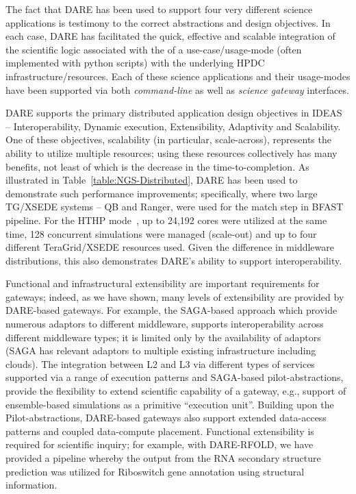 \documentclass[]{svjour3}
\begin{document}
The fact that DARE has been used to support four very different
science applications is testimony to the correct abstractions and
design objectives. In each case, DARE has facilitated the quick,
effective and scalable integration of the scientific logic associated
with the of a use-case/usage-mode (often implemented with python
scripts) with the underlying HPDC infrastructure/resources. Each of
these science applications and their usage-modes have been supported
via both {\it command-line} as well as {\it science gateway}
interfaces.

DARE supports the primary distributed application design objectives in
IDEAS~\cite{ideas} -- Interoperability, Dynamic execution,
Extensibility, Adaptivity and Scalability. One of these objectives,
scalability (in particular, scale-across), represents the ability to
utilize multiple resources; using these resources collectively has
many benefits, not least of which is the decrease in the
time-to-completion. As illustrated in
Table~\ref{table:NGS-Distributed}, DARE has been used to demonstrate
such performance improvements; specifically, where two large TG/XSEDE
systems -- QB and Ranger, were used for the match step in BFAST
pipeline. For the HTHP mode~\cite{bigjob-ccgrid12}, up to 24,192 cores
were utilized at the same time, 128 concurrent simulations were
managed (scale-out) and up to four different TeraGrid/XSEDE resources
used. Given the difference in middleware distributions, this also
demonstrates DARE's ability to support interoperability.

Functional and infrastructural extensibility are important
requirements for gateways; indeed, as we have shown, many levels of
extensibility are provided by DARE-based gateways. For example, the
SAGA-based approach which provide numerous adaptors to different
middleware, supports interoperability across different middleware
types; it is limited only by the availability of adaptors (SAGA has
relevant adaptors to multiple existing infrastructure including
clouds). The integration between L2 and L3 via different types of
services supported via a range of execution patterns and SAGA-based
pilot-abstractions, provide the flexibility to extend scientific
capability of a gateway, e.g., support of ensemble-based simulations
as a primitive ``execution unit''. Building upon the
Pilot-abstractions, DARE-based gateways also support extended
data-access patterns and coupled data-compute placement. Functional
extensibility is required for scientific inquiry; for example, with
DARE-RFOLD, we have provided a pipeline whereby the output from the
RNA secondary structure prediction was utilized for Riboswitch gene
annotation using structural information.
\end{document}
